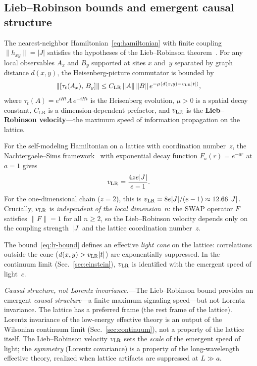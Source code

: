 \subsection{Lieb--Robinson bounds and emergent causal structure}
\label{sec:lr-bounds}

The nearest-neighbor Hamiltonian~\eqref{eq:hamiltonian} with finite
coupling $\|h_{xy}\| = |J|$ satisfies the hypotheses of the
Lieb--Robinson theorem~\cite{LiebRobinson1972, NachtergaeleSims2006}.
For any local observables $A_x$ and $B_y$ supported at sites $x$
and~$y$ separated by graph distance $d(x,y)$, the Heisenberg-picture
commutator is bounded by
\begin{equation}
  \lVert[\tau_t(A_x),\, B_y]\rVert
  \leq C_{\mathrm{LR}}\, \lVert A\rVert\, \lVert B\rVert\,
  e^{-\mu(d(x,y) - v_{\mathrm{LR}} |t|)},
  \label{eq:lr-bound}
\end{equation}
where $\tau_t(A) = e^{iHt} A\, e^{-iHt}$ is the Heisenberg evolution,
$\mu > 0$ is a spatial decay constant, $C_{\mathrm{LR}}$ is a
dimension-dependent prefactor, and $v_{\mathrm{LR}}$ is the \textbf{Lieb--Robinson
velocity}---the maximum speed of information propagation on the
lattice.

For the self-modeling Hamiltonian on a lattice with coordination
number~$z$, the Nachtergaele--Sims
framework~\cite{NachtergaeleSims2006} with exponential decay function
$F_a(r) = e^{-ar}$ at $a = 1$ gives
\begin{equation}
  v_{\mathrm{LR}} = \frac{4ze|J|}{e - 1}.
  \label{eq:vlr}
\end{equation}
For the one-dimensional chain ($z = 2$), this is $v_{\mathrm{LR}} = 8e|J|/(e-1)
\approx 12.66\,|J|$.  Crucially, $v_{\mathrm{LR}}$ is \emph{independent of the
local dimension~$n$}: the SWAP operator $F$ satisfies $\|F\| = 1$ for
all $n \geq 2$, so the Lieb--Robinson velocity depends only on the
coupling strength~$|J|$ and the lattice coordination number~$z$.

The bound~\eqref{eq:lr-bound} defines an effective \emph{light cone}
on the lattice: correlations outside the cone ($d(x,y) > v_{\mathrm{LR}} |t|$)
are exponentially suppressed.  In the continuum limit
(Sec.~\ref{sec:einstein}), $v_{\mathrm{LR}}$ is identified with the emergent
speed of light~$c$.

\emph{Causal structure, not Lorentz invariance.}---The Lieb--Robinson
bound provides an emergent \emph{causal structure}---a finite maximum
signaling speed---but not Lorentz invariance.  The lattice has a
preferred frame (the rest frame of the lattice).  Lorentz invariance
of the low-energy effective theory is an output of the Wilsonian
continuum limit (Sec.~\ref{sec:continuum}), not a property of the
lattice itself.  The Lieb--Robinson velocity $v_{\mathrm{LR}}$ sets the
\emph{scale} of the emergent speed of light; the \emph{symmetry}
(Lorentz covariance) is a property of the long-wavelength effective
theory, realized when lattice artifacts are suppressed at
$L \gg a$.
